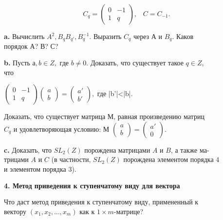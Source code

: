 \documentclass{../template/mai_book}
\begin{document}
$$C_q = \begin{pmatrix}
0 & -1\\ 1 & q
\end{pmatrix},\;\;\;C = C_{-1}.$$

\medskip

{\bf a.} Вычислить $A^2, B_qB_{q'}, B_q^{-1}.$ Выразить $C_q$ через А и $B_q$. Каков\\ 
порядок $А$? $В$? $С$?

\medskip

{\bf b.} Пусть $а,b \in \mathit{Z},$ где $b\ne 0$. Доказать, что существует такое $q \in \mathit{Z}$,\\ 
что 

{\begin{center}
$\begin{pmatrix}
0 & -1\\ 1 & q
\end{pmatrix}\begin{pmatrix}
a\\ b
\end{pmatrix}
=\begin{pmatrix}
a'\\ b'
\end{pmatrix},$\;\;\; где |b'|<|b|.
\end{center}}

 
Доказать, что существует матрица М, равная произведению матриц \\
$C_q$ и удовлетворяющая условию: М $
\begin{pmatrix}
a\\ b
\end{pmatrix}
=\begin{pmatrix}
a'\\ 0 
\end{pmatrix}.
$ 

\medskip

{\bf c.} Доказать, что $SL_2(\mathit{Z})$ порождена матрицами $A$ и $B$, а также 
ма-\\трицами $A$ и $C$ (в частности, $SL_2(\mathit{Z})$ порождена элементом порядка 4\\ 
и элементом порядка 3). 

\medskip

{\noindent\bf 4. Метод приведения к ступенчатому виду для вектора }

Что даст метод приведения к ступенчатому виду, примененный к\\ 
вектору $ (x_1,x_2,...,x_m) $ как к $1 \times m$-матрице? 
\end{document}
